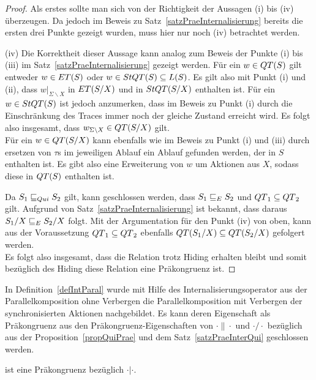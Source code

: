 \begin{proof}
  Als erstes sollte man sich von der Richtigkeit der Aussagen (i) bis (iv)
  überzeugen. Da jedoch im Beweis zu Satz~\ref{satzPraeInternalisierung}
  bereits die ersten drei Punkte gezeigt wurden, muss hier nur noch (iv)
  betrachtet werden.

  (iv)
  Die Korrektheit dieser Aussage kann analog zum Beweis der Punkte (i) bis
  (iii) im Satz~\ref{satzPraeInternalisierung} gezeigt werden. Für ein $w\in
  QT{}(S)$ gilt entweder $w\in ET{}(S)$ oder $w\in StQT{}(S)\subseteq L(S)$. Es
  gilt also mit Punkt (i) und (ii), dass $w|_{\Sigma\backslash X}$ in
  $ET{}(S/X)$ und in $StQT{}(S/X)$ enthalten ist. Für ein $w\in StQT{}(S)$
  ist jedoch anzumerken, dass im Beweis
  zu Punkt (i) durch die Einschränkung des Traces immer noch der gleiche
  Zustand erreicht wird. Es folgt also insgesamt, dass $w _{\Sigma\backslash
  X}\in QT{}(S/X)$ gilt.\\
  Für ein $w\in QT{}(S/X)$ kann ebenfalls wie im Beweis zu Punkt (i) und (iii)
  durch ersetzen von $\tau$s im jeweiligen Ablauf ein Ablauf gefunden werden,
  der in $S$ enthalten ist. Es gibt also eine Erweiterung von $w$ um Aktionen
  aus $X$, sodass diese in $QT{}(S)$ enthalten ist.

  Da $S_1\sqsubseteq _{Qui} S_2$ gilt, kann geschlossen werden, dass $S_1\sqsubseteq _E S_2$ und
  $QT{}_1\subseteq QT{}_2$ gilt. Aufgrund von
  Satz~\ref{satzPraeInternalisierung} ist bekannt, dass daraus $S_1/X\sqsubseteq _E
  S_2/X$ folgt. Mit der Argumentation für den Punkt (iv) von oben, kann aus der
  Voraussetzung $QT{}_1\subseteq QT{}_2$ ebenfalls $QT{}(S_1/X)\subseteq
  QT{}(S_2/X)$ gefolgert werden.\\
  Es folgt also insgesamt, dass die Relation \QRel{} trotz Hiding erhalten
  bleibt und somit bezüglich des Hiding diese Relation eine Präkongruenz ist.
\end{proof}

In Definition~\ref{defIntParal} wurde mit Hilfe des Internalisierungsoperator
aus der Parallelkomposition ohne Verbergen die Parallelkomposition mit
Verbergen der synchronisierten Aktionen nachgebildet. Es kann deren
Eigenschaft als Präkongruenz aus den Präkongruenz-Eigenschaften von
$\cdot\|\cdot$ und $\cdot /\cdot$ bezüglich \QRel{} aus der
Proposition~\ref{propQuiPrae} und dem Satz~\ref{satzPraeInterQui} geschlossen
werden.

\begin{kor}
  \QRel{} ist eine Präkongruenz bezüglich $\cdot |\cdot$.
\end{kor}

